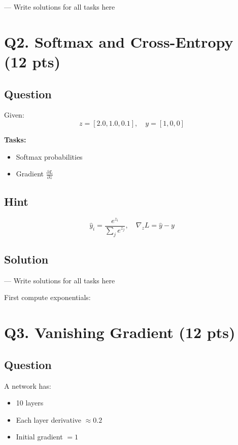\documentclass[11pt]{article}
\begin{document}
--- Write solutions for all tasks here 

\section*{Q2. Softmax and Cross-Entropy (12 pts)}

\subsection*{Question}

Given:
\[
z=[2.0,1.0,0.1], \quad y=[1,0,0]
\]

\textbf{Tasks:}
\begin{itemize}
    \item Softmax probabilities
    \item Gradient $\frac{\partial L}{\partial z}$
\end{itemize}

\subsection*{Hint}

\[
\hat{y}_i=\frac{e^{z_i}}{\sum_j e^{z_j}},
\quad
\nabla_z L=\hat{y}-y
\]

\subsection*{Solution}

--- Write solutions for all tasks here 

First compute exponentials:

\section*{Q3. Vanishing Gradient (12 pts)}

\subsection*{Question}

A network has:
\begin{itemize}
    \item 10 layers
    \item Each layer derivative $\approx 0.2$
    \item Initial gradient $=1$
\end{itemize}
\end{document}
